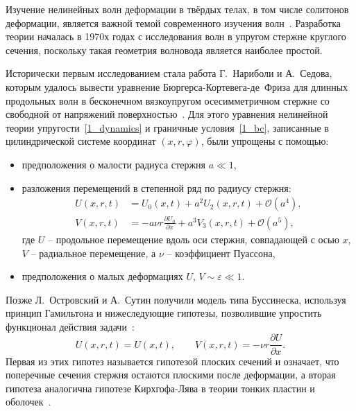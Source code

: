 \documentclass[12pt, a4paper]{report}
\newcommand{\pdiff}[2]{\frac{\partial #1}{\partial #2}}
\begin{document}
Изучение нелинейных волн деформации в твёрдых телах, в том числе солитонов деформации, является важной темой современного изучения волн~\cite{S_book, P_book}.
Разработка теории началась в 1970х годах с исследования волн в упругом стержне круглого сечения, поскольку такая геометрия волновода является наиболее простой.

Исторически первым исследованием стала работа Г.~Нариболи и А.~Седова, которым удалось вывести уравнение Бюргерса-Кортевега-де~Фриза для длинных продольных волн в бесконечном вязкоупругом осесимметричном стержне со свободной от напряжений поверхностью~\cite{NS}. Для этого уравнения нелинейной теории упругости~\eqref{1_dynamics} и граничные условия~\eqref{1_bc}, записанные в цилиндрической системе координат $(x,r,\varphi)$, были упрощены с помощью:
\begin{itemize}[noitemsep,topsep=1pt]
	\item предположения о малости радиуса стержня $a \ll 1$,
	\item разложения перемещений в степенной ряд по радиусу стержня: 
	\begin{align}\label{1_nariboli}
	U(x,r,t) &= U_0(x,t) + a^2 U_2(x,r,t) + \mathcal{O}(a^4),\\
	V(x,r,t) &= -a \nu r \pdiff{U_0}{x} + a^3 V_3(x,r,t) + \mathcal{O}(a^5),
	\end{align}
	где $U$ -- продольное перемещение вдоль оси стержня, совпадающей с осью $x$, $V$ -- радиальное перемещение, а $\nu$ -- коэффициент Пуассона,
	\item предположения о малых деформациях $U, \, V \sim \varepsilon \ll 1$.
\end{itemize}
Позже Л.~Островский и А.~Сутин получили модель типа Буссинеска, %
используя принцип Гамильтона и нижеследующие гипотезы, позволившие упростить функционал действия задачи~\cite{OS}: 
\begin{equation}\label{1_ostrovsky_hyp}
U(x,r,t) = U(x,t), \qquad V(x,r,t) = -\nu r \pdiff U x.
\end{equation}
Первая из этих гипотез называется гипотезой плоских сечений и означает, что поперечные сечения стержня остаются плоскими после деформации, а вторая гипотеза аналогична гипотезе Кирхгофа-Лява в теории тонких пластин и оболочек~\cite{Love}.
\end{document}
